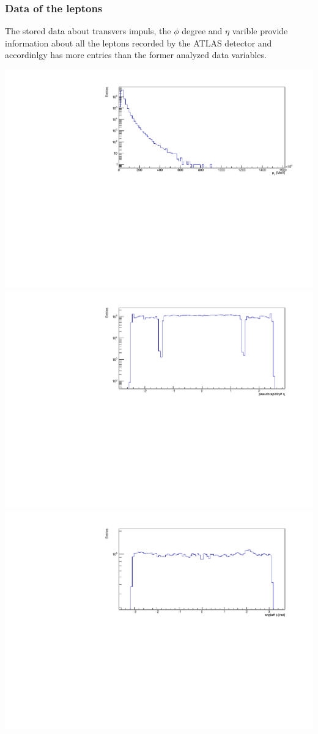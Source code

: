 \documentclass[12pt, a4paper, bibliography=totoc]{scrartcl}
\begin{document}
\begin{multicols}{2}
\subsubsection{Data of the leptons}
The stored data about transvers impuls, the $\phi$ degree and $\eta$ varible provide information about all the leptons recorded by the ATLAS detector and accordinlgy has more entries than the former analyzed data variables.
\begin{center}
    \includegraphics[width=\linewidth]{fig/p_T_final.pdf}
    \includegraphics[width=\linewidth]{fig/eta_final.pdf}
    \includegraphics[width=\linewidth]{fig/phi_final.pdf}

\end{center}
\end{multicols}
\end{document}
